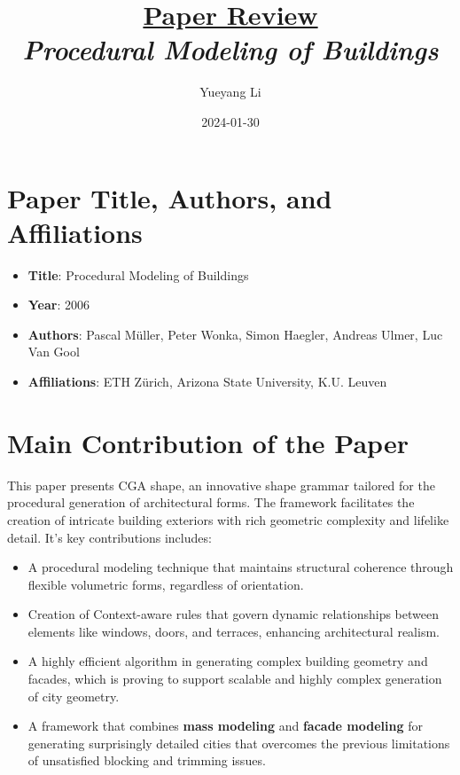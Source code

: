 \documentclass[12pt]{article}
\newcommand{\paperTitle}{
    \textit{\normalsize{Procedural Modeling of Buildings}}  
}
\begin{document}
\title{\Large\uline{\textbf{Paper Review}} \\[0.4em]
\paperTitle{} 
}
\author{Yueyang Li}
\date{2024-01-30}

\maketitle

\section{Paper Title, Authors, and Affiliations}
\begin{itemize}[noitemsep]
    \item \textbf{Title}: Procedural Modeling of Buildings
    \item  \textbf{Year}: 2006
    \item \textbf{Authors}: Pascal Müller, Peter Wonka, Simon Haegler, Andreas Ulmer, Luc Van Gool
    \item \textbf{Affiliations}: ETH Zürich, Arizona State University, K.U. Leuven
\end{itemize}

\section{Main Contribution of the Paper}
This paper presents CGA shape, an innovative shape grammar tailored for the procedural generation of architectural forms. The framework facilitates the creation of intricate building exteriors with rich geometric complexity and lifelike detail. It's key contributions includes:
\begin{itemize}[noitemsep]
    \item A procedural modeling technique that maintains structural coherence through flexible volumetric forms, regardless of orientation.
    \item Creation of Context-aware rules that govern dynamic relationships between elements like windows, doors, and terraces, enhancing architectural realism.
    \item A highly efficient algorithm in generating complex building geometry and facades, which is proving to support scalable and highly complex generation of city geometry. 
    \item A framework that combines \textbf{mass modeling} and \textbf{facade modeling} for generating surprisingly detailed cities that overcomes the previous limitations of unsatisfied blocking and trimming issues.
\end{itemize}
\end{document}
